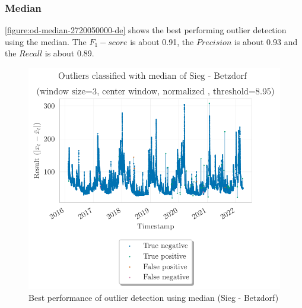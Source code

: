\subsubsection{Median}
\autoref{figure:od-median-2720050000-de} shows the best performing outlier detection using the median. The $F_1-score$ is about 0.91, the $Precision$ is about 0.93 and the $Recall$ is about 0.89.
\begin{figure}[H]
    \centering 
    \includegraphics{plots/pdfs/2720050000-de/od_median_2720050000-de_all.pdf}
    \caption{Best performance of outlier detection using median (Sieg - Betzdorf)}
    \label{figure:od-median-2720050000-de}
\end{figure}
\clearpage
